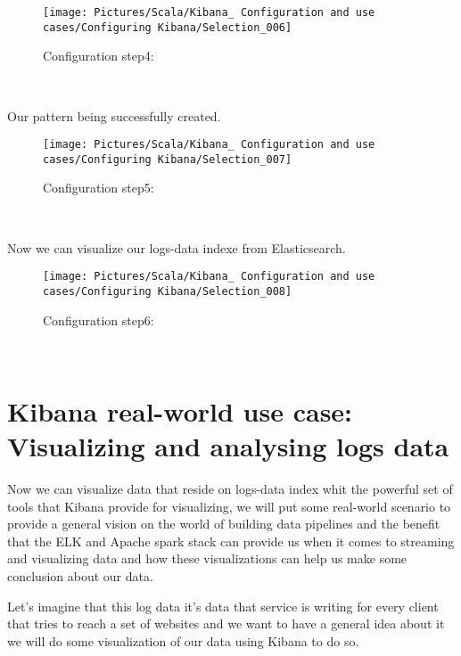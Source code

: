 \begin{spacing}{1.2}
\begin{figure}[!htb] 
\begin{center} 
\texttt{[image: Pictures/Scala/Kibana\_ Configuration and use cases/Configuring Kibana/Selection\_006]} 
\end{center} 
\caption{Configuration step4: } 
\end{figure}  \FloatBarrier
\\

\newpage


\par Our pattern being successfully created.
\\
\begin{figure}[!htb] 
\begin{center} 
\texttt{[image: Pictures/Scala/Kibana\_ Configuration and use cases/Configuring Kibana/Selection\_007]} 
\end{center} 
\caption{Configuration step5:} 
\end{figure}  \FloatBarrier
\\
\par Now we can visualize our logs-data indexe from Elasticsearch.
\\
\begin{figure}[!htb] 
\begin{center} 
\texttt{[image: Pictures/Scala/Kibana\_ Configuration and use cases/Configuring Kibana/Selection\_008]} 
\end{center} 
\caption{Configuration step6:} 
\end{figure}  \FloatBarrier

\\
\section{Kibana real-world use case: Visualizing and analysing logs data}


\par Now we can visualize data that reside on logs-data index whit the powerful set of tools that Kibana provide for visualizing, we will put some real-world scenario to provide a general vision on the world of building data pipelines and the benefit that the ELK and Apache spark stack can provide us when it comes to streaming and visualizing data and how these visualizations can help us make some conclusion about our data.

\par Let's imagine that this log data it's data that service is writing for every client that tries to reach a set of websites and we want to have a general idea about it we will do some visualization of our data using Kibana to do so.


\end{spacing}
